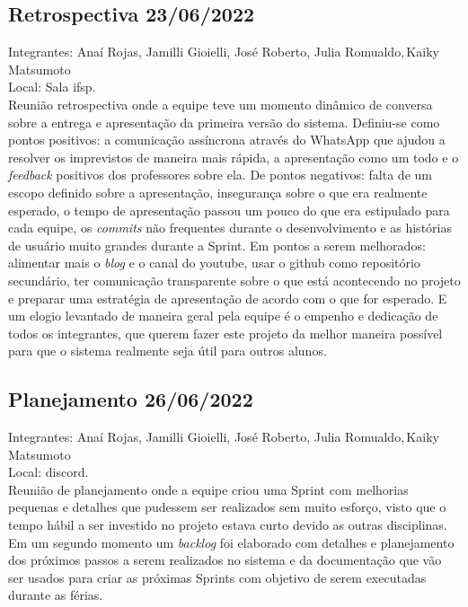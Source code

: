 \subsection{Retrospectiva 23/06/2022}
\noindent Integrantes: Anaí Rojas, Jamilli Gioielli, José Roberto, Julia Romualdo,\,Kaiky Matsumoto \\
Local: Sala \acs{ifsp}. \\
Reunião retrospectiva onde a equipe teve um momento dinâmico de conversa sobre a entrega e apresentação da primeira versão do sistema. Definiu-se como pontos positivos: a comunicação assíncrona através do \gls{WhatsApp} que ajudou a resolver os imprevistos de maneira mais rápida, a apresentação como um todo e o \textit{feedback} positivos dos professores sobre ela. De pontos negativos: falta de um escopo definido sobre a apresentação,  insegurança sobre o que era realmente esperado, o tempo de apresentação passou um pouco do que era estipulado para cada equipe, os \textit{commits} não frequentes durante o desenvolvimento e as histórias de usuário muito grandes durante a \gls{Sprint}. Em pontos a serem melhorados: alimentar mais o \textit{blog} e o canal do \gls{youtube}, usar o \gls{github} como repositório secundário, ter comunicação transparente sobre o que está acontecendo no projeto e preparar uma estratégia de apresentação de acordo com o que for esperado. E um elogio levantado de maneira geral pela equipe é o empenho e dedicação de todos os integrantes, que querem fazer este projeto da melhor maneira possível para que o sistema realmente seja útil para outros alunos. 

\subsection{Planejamento 26/06/2022}
\noindent Integrantes: Anaí Rojas, Jamilli Gioielli, José Roberto, Julia Romualdo,\,Kaiky Matsumoto \\
Local: \gls{discord}. \\
Reunião de planejamento onde a equipe criou uma \gls{Sprint} com melhorias pequenas e detalhes que pudessem ser realizados sem muito esforço, visto que o tempo hábil a ser investido no projeto estava curto devido as outras disciplinas. Em um segundo momento um \textit{backlog} foi elaborado com detalhes e planejamento dos próximos passos a serem realizados no sistema e da documentação que vão ser usados para criar as próximas \glspl{Sprint} com objetivo de serem executadas durante as férias.

